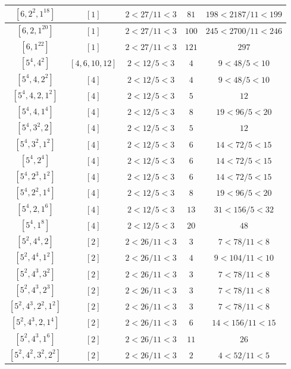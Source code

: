 \documentclass{article}%
\begin{document}
\begin{center}
\begin{longtable}{||c|c|c|c|c||}
$[6, 2^{2}, 1^{18}]$ & $[1]$ & $2 < 27/11 < 3$ & $81$ & $198 < 2187/11 < 199$ \\ \hline 
$[6, 2, 1^{20}]$ & $[1]$ & $2 < 27/11 < 3$ & $100$ & $245 < 2700/11 < 246$ \\ \hline 
$[6, 1^{22}]$ & $[1]$ & $2 < 27/11 < 3$ & $121$ & $297$ \\ \hline 
$[5^{4}, 4^{2}]$ & $[4, 6, 10, 12]$ & $2 < 12/5 < 3$ & $4$ & $9 < 48/5 < 10$ \\ \hline 
$[5^{4}, 4, 2^{2}]$ & $[4]$ & $2 < 12/5 < 3$ & $4$ & $9 < 48/5 < 10$ \\ \hline 
$[5^{4}, 4, 2, 1^{2}]$ & $[4]$ & $2 < 12/5 < 3$ & $5$ & $12$ \\ \hline 
$[5^{4}, 4, 1^{4}]$ & $[4]$ & $2 < 12/5 < 3$ & $8$ & $19 < 96/5 < 20$ \\ \hline 
$[5^{4}, 3^{2}, 2]$ & $[4]$ & $2 < 12/5 < 3$ & $5$ & $12$ \\ \hline 
$[5^{4}, 3^{2}, 1^{2}]$ & $[4]$ & $2 < 12/5 < 3$ & $6$ & $14 < 72/5 < 15$ \\ \hline 
$[5^{4}, 2^{4}]$ & $[4]$ & $2 < 12/5 < 3$ & $6$ & $14 < 72/5 < 15$ \\ \hline 
$[5^{4}, 2^{3}, 1^{2}]$ & $[4]$ & $2 < 12/5 < 3$ & $6$ & $14 < 72/5 < 15$ \\ \hline 
$[5^{4}, 2^{2}, 1^{4}]$ & $[4]$ & $2 < 12/5 < 3$ & $8$ & $19 < 96/5 < 20$ \\ \hline 
$[5^{4}, 2, 1^{6}]$ & $[4]$ & $2 < 12/5 < 3$ & $13$ & $31 < 156/5 < 32$ \\ \hline 
$[5^{4}, 1^{8}]$ & $[4]$ & $2 < 12/5 < 3$ & $20$ & $48$ \\ \hline 
$[5^{2}, 4^{4}, 2]$ & $[2]$ & $2 < 26/11 < 3$ & $3$ & $7 < 78/11 < 8$ \\ \hline 
$[5^{2}, 4^{4}, 1^{2}]$ & $[2]$ & $2 < 26/11 < 3$ & $4$ & $9 < 104/11 < 10$ \\ \hline 
$[5^{2}, 4^{3}, 3^{2}]$ & $[2]$ & $2 < 26/11 < 3$ & $3$ & $7 < 78/11 < 8$ \\ \hline 
$[5^{2}, 4^{3}, 2^{3}]$ & $[2]$ & $2 < 26/11 < 3$ & $3$ & $7 < 78/11 < 8$ \\ \hline 
$[5^{2}, 4^{3}, 2^{2}, 1^{2}]$ & $[2]$ & $2 < 26/11 < 3$ & $3$ & $7 < 78/11 < 8$ \\ \hline 
$[5^{2}, 4^{3}, 2, 1^{4}]$ & $[2]$ & $2 < 26/11 < 3$ & $6$ & $14 < 156/11 < 15$ \\ \hline 
$[5^{2}, 4^{3}, 1^{6}]$ & $[2]$ & $2 < 26/11 < 3$ & $11$ & $26$ \\ \hline 
$[5^{2}, 4^{2}, 3^{2}, 2^{2}]$ & $[2]$ & $2 < 26/11 < 3$ & $2$ & $4 < 52/11 < 5$ \\ \hline 

\end{longtable}
\end{center}
\end{document}
